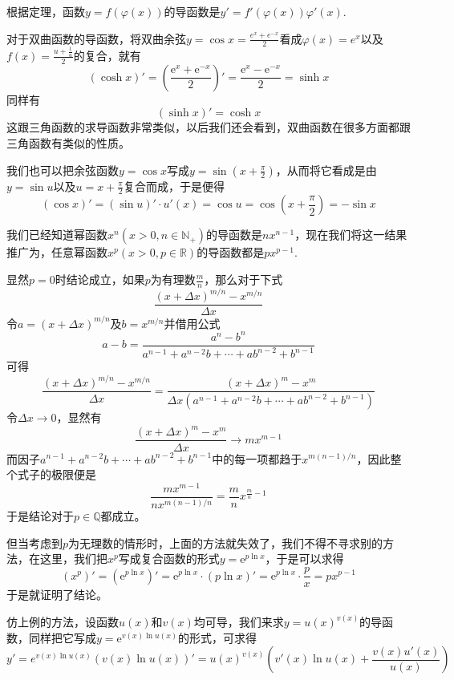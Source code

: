 根据定理，函数$y=f(\varphi(x))$的导函数是$y'=f'(\varphi(x))\varphi '(x)$.

\begin{example}
  对于双曲函数的导函数，将双曲余弦$y=\cos{x}=\frac{e^x+e^{-x}}{2}$看成$\varphi(x)=e^x$以及$f(x)=\frac{u+\frac{1}{u}}{2}$的复合，就有
  \[ (\cosh{x})' = \left( \frac{\mathrm{e}^x+\mathrm{e}^{-x}}{2} \right)' = \frac{\mathrm{e}^x-\mathrm{e}^{-x}}{2} = \sinh{x} \]
  同样有
  \[ (\sinh{x})' = \cosh{x} \]
  这跟三角函数的求导函数非常类似，以后我们还会看到，双曲函数在很多方面都跟三角函数有类似的性质。
\end{example}

\begin{example}
  我们也可以把余弦函数$y=\cos{x}$写成$y=\sin{\left( x+\frac{\pi}{2} \right)}$，从而将它看成是由$y=\sin{u}$以及$u=x+\frac{\pi}{2}$复合而成，于是便得
  \[ (\cos{x})' = (\sin{u})' \cdot u'(x) = \cos{u} = \cos{\left( x+\frac{\pi}{2} \right)} = - \sin{x} \]
\end{example}

\begin{example}
  我们已经知道幂函数$x^n(x>0, n \in \mathbb{N}_+)$的导函数是$nx^{n-1}$，现在我们将这一结果推广为，任意幂函数$x^p(x>0, p \in \mathbb{R})$的导函数都是$px^{p-1}$.

  显然$p=0$时结论成立，如果$p$为有理数$\frac{m}{n}$，那么对于下式
  \[ \frac{(x+\Delta x)^{m/n}-x^{m/n}}{\Delta x} \]
  令$a=(x+\Delta x)^{m/n}$及$b=x^{m/n}$并借用公式
  \[ a-b = \frac{a^n-b^n}{a^{n-1}+a^{n-2}b+\cdots+ab^{n-2}+b^{n-1}} \]
  可得
  \[ \frac{(x+\Delta x)^{m/n}-x^{m/n}}{\Delta x} = \frac{(x+\Delta x)^m - x^m}{\Delta x (a^{n-1}+a^{n-2}b+\cdots+ab^{n-2}+b^{n-1})} \]
  令$\Delta x \to 0$，显然有
  \[ \frac{(x+\Delta x)^m - x^m}{\Delta x} \to m x^{m-1} \]
  而因子$a^{n-1}+a^{n-2}b+\cdots+ab^{n-2}+b^{n-1}$中的每一项都趋于$x^{m(n-1)/n}$，因此整个式子的极限便是
  \[ \frac{mx^{m-1}}{nx^{m(n-1)/n}} = \frac{m}{n} x^{\frac{m}{n}-1} \]
  于是结论对于$p \in \mathbb{Q}$都成立。

  但当考虑到$p$为无理数的情形时，上面的方法就失效了，我们不得不寻求别的方法，在这里，我们把$x^p$写成复合函数的形式$y=\mathrm{e}^{p \ln{x}}$，于是可以求得
  \[ (x^p)' = (\mathrm{e}^{p \ln{x}})' = \mathrm{e}^{p \ln{x}} \cdot (p \ln{x})' = \mathrm{e}^{p \ln{x}} \cdot \frac{p}{x} = px^{p-1} \]
  于是就证明了结论。
\end{example}

\begin{example}
  仿上例的方法，设函数$u(x)$和$v(x)$均可导，我们来求$y=u(x)^{v(x)}$的导函数，同样把它写成$y=\mathrm{e}^{v(x) \ln{u(x)}}$的形式，可求得
  \[ y'=e^{v(x) \ln{u(x)}} (v(x) \ln{u(x)})' = u(x)^{v(x)} (v'(x)\ln{u(x)}+\frac{v(x)u'(x)}{u(x)}) \]
\end{example}

